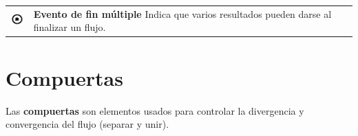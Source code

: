 \begin{itemize}
\begin{tabular}{| m{} m{} | }
		\centering\noindent\includegraphics[width=18pt]{introduccion/imagenes/procesos/bpmn/MultipleEndEvent.png} & {\bf Evento de fin múltiple} Indica que varios resultados pueden darse al finalizar un flujo. \\

	\end{tabular}%
\end{itemize}

\section{Compuertas}

Las {\bf compuertas} son elementos usados para controlar la divergencia y convergencia del flujo (separar y unir).\\

